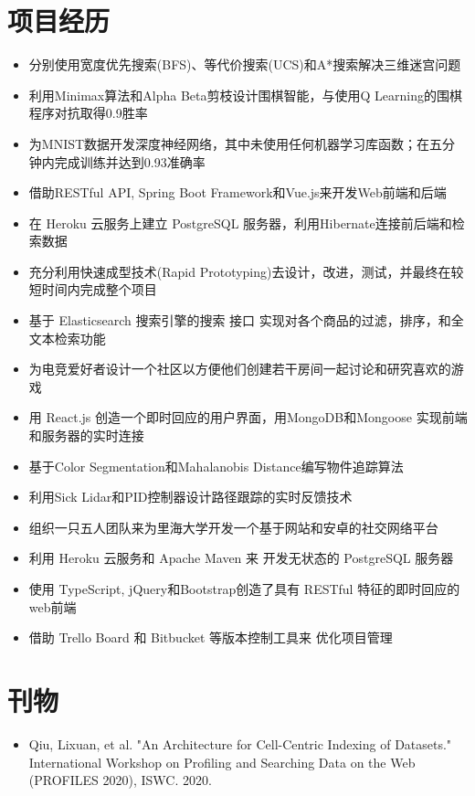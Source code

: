 \documentclass{resume}
\begin{document}
\section{项目经历}
\begin{itemize}
  \item 分别使用宽度优先搜索(BFS)、等代价搜索(UCS)和A*搜索解决三维迷宫问题
  \item 利用Minimax算法和Alpha Beta剪枝设计围棋智能，与使用Q Learning的围棋程序对抗取得0.9胜率
  \item 为MNIST数据开发深度神经网络，其中未使用任何机器学习库函数；在五分钟内完成训练并达到0.93准确率
\end{itemize}
\vspace{-10pt}
\begin{itemize}
  \item 借助RESTful API, Spring Boot Framework和Vue.js来开发Web前端和后端
  \item 在 Heroku 云服务上建立 PostgreSQL 服务器，利用Hibernate连接前后端和检索数据
  \item 充分利用快速成型技术(Rapid Prototyping)去设计，改进，测试，并最终在较短时间内完成整个项目
  \item 基于 Elasticsearch 搜索引擎的搜索 接口 实现对各个商品的过滤，排序，和全文本检索功能
\end{itemize}
\vspace{-8pt}
\begin{itemize}
  \item 为电竞爱好者设计一个社区以方便他们创建若干房间一起讨论和研究喜欢的游戏
  \item 用 React.js 创造一个即时回应的用户界面，用MongoDB和Mongoose 实现前端和服务器的实时连接
\end{itemize}
\vspace{-8pt}
\begin{itemize}
  \item 基于Color Segmentation和Mahalanobis Distance编写物件追踪算法
  \item 利用Sick Lidar和PID控制器设计路径跟踪的实时反馈技术
\end{itemize}
\vspace{-8pt}
\begin{itemize}
  \item 组织一只五人团队来为里海大学开发一个基于网站和安卓的社交网络平台
  \item 利用 Heroku 云服务和 Apache Maven 来 开发无状态的 PostgreSQL 服务器
  \item 使用 TypeScript, jQuery和Bootstrap创造了具有 RESTful 特征的即时回应的web前端
  \item 借助 Trello Board 和 Bitbucket 等版本控制工具来 优化项目管理
\end{itemize}

\section{刊物}
\begin{itemize}[parsep=0.2ex]
  \item Qiu, Lixuan, et al. "An Architecture for Cell-Centric Indexing of Datasets." International Workshop on Profiling and Searching Data on the Web (PROFILES 2020), ISWC. 2020.
\end{itemize}
\end{document}

